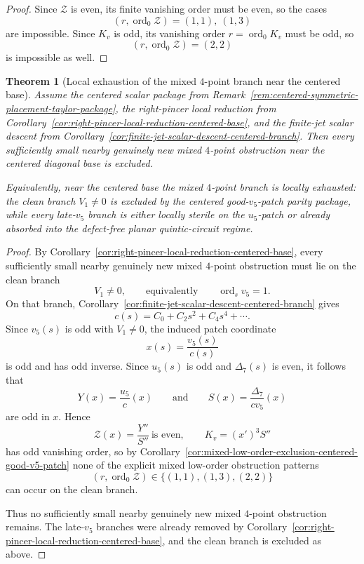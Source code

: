 \documentclass[11pt,a4paper]{amsart}
\theoremstyle{plain}
\newtheorem{theorem}{Theorem}[section]
\theoremstyle{definition}
\begin{document}
\begin{proof}
Since $\mathcal Z$ is even, its finite vanishing order must be even, so the
cases
\[
(r,\operatorname{ord}_0\mathcal Z)=(1,1),\ (1,3)
\]
are impossible. Since $K_v$ is odd, its vanishing order $r=\operatorname{ord}_0K_v$
must be odd, so
\[
(r,\operatorname{ord}_0\mathcal Z)=(2,2)
\]
is impossible as well.
\end{proof}

\begin{theorem}[Local exhaustion of the mixed $4$-point branch near the centered base]
\label{thm:local-exhaustion-mixed-four-point-centered-base}
Assume the centered scalar package from
Remark~\ref{rem:centered-symmetric-placement-taylor-package}, the right-pincer
local reduction from
Corollary~\ref{cor:right-pincer-local-reduction-centered-base}, and the finite-jet
scalar descent from
Corollary~\ref{cor:finite-jet-scalar-descent-centered-branch}. Then every
sufficiently small nearby genuinely new mixed $4$-point obstruction near the
centered diagonal base is excluded.

Equivalently, near the centered base the mixed $4$-point branch is locally
exhausted: the clean branch $V_1\neq 0$ is excluded by the centered
good-$v_5$-patch parity package, while every late-$v_5$ branch is either
locally sterile on the $u_5$-patch or already absorbed into the defect-free
planar quintic-circuit regime.
\end{theorem}

\begin{proof}
By Corollary~\ref{cor:right-pincer-local-reduction-centered-base}, every
sufficiently small nearby genuinely new mixed $4$-point obstruction must lie
on the clean branch
\[
V_1\neq 0,
\qquad\text{equivalently}\qquad
\operatorname{ord}_s v_5=1.
\]
On that branch, Corollary~\ref{cor:finite-jet-scalar-descent-centered-branch}
gives
\[
c(s)=C_0+C_2s^2+C_4s^4+\cdots.
\]
Since $v_5(s)$ is odd with $V_1\neq 0$, the induced patch coordinate
\[
x(s)=\frac{v_5(s)}{c(s)}
\]
is odd and has odd inverse. Since $u_5(s)$ is odd and $\Delta_7(s)$ is
even, it follows that
\[
Y(x)=\frac{u_5}{c}(x)
\qquad\text{and}\qquad
S(x)=\frac{\Delta_7}{cv_5}(x)
\]
are odd in $x$. Hence
\[
\mathcal Z(x)=\frac{Y''}{S''}\ \text{is even},
\qquad
K_v=(x')^3S''
\]
has odd vanishing order, so by
Corollary~\ref{cor:mixed-low-order-exclusion-centered-good-v5-patch}
none of the explicit mixed low-order obstruction patterns
\[
(r,\operatorname{ord}_0\mathcal Z)\in\{(1,1),(1,3),(2,2)\}
\]
can occur on the clean branch.

Thus no sufficiently small nearby genuinely new mixed $4$-point obstruction
remains. The late-$v_5$ branches were already removed by
Corollary~\ref{cor:right-pincer-local-reduction-centered-base}, and the clean
branch is excluded as above.
\end{proof}
\end{document}
